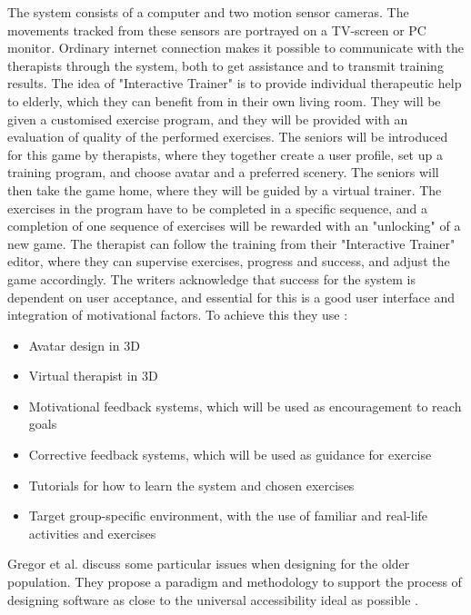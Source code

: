 The system consists of a computer and two motion sensor cameras. The movements tracked from these sensors are portrayed on a TV-screen or PC monitor. Ordinary internet connection makes it possible to communicate with the therapists through the system, both to get assistance and to transmit training results. The idea of "Interactive Trainer" is to provide individual therapeutic help to elderly, which they can benefit from in their own living room. They will be given a customised exercise program, and they will be provided with an evaluation of quality of the performed exercises. The seniors will be introduced for this game by therapists, where they together create a user profile, set up a training program, and choose avatar and a preferred scenery. The seniors will then take the game home, where they will be guided by a virtual trainer. The exercises in the program have to be completed in a specific sequence, and a completion of one sequence of exercises will be rewarded with an "unlocking" of a new game. The therapist can follow the training from their "Interactive Trainer" editor, where they can supervise exercises, progress and success, and adjust the game accordingly. The writers acknowledge that success for the system is dependent on user acceptance, and essential for this is a good user interface and integration of motivational factors. To achieve this they use \cite{john2012smartsenior}:

\begin{itemize}
\item Avatar design in 3D
\item Virtual therapist in 3D
\item Motivational feedback systems, which will be used as encouragement  to reach goals
\item Corrective feedback systems, which will be used as guidance for exercise 
\item Tutorials for how to learn the system and chosen exercises
\item Target group-specific environment, with the use of familiar and real-life activities and exercises 
\end{itemize} 

Gregor et al. \cite{gregor} discuss some particular issues when designing for the older population. They propose a paradigm and methodology to support the process of designing software as close to the universal accessibility ideal as possible \cite{gregor}.

